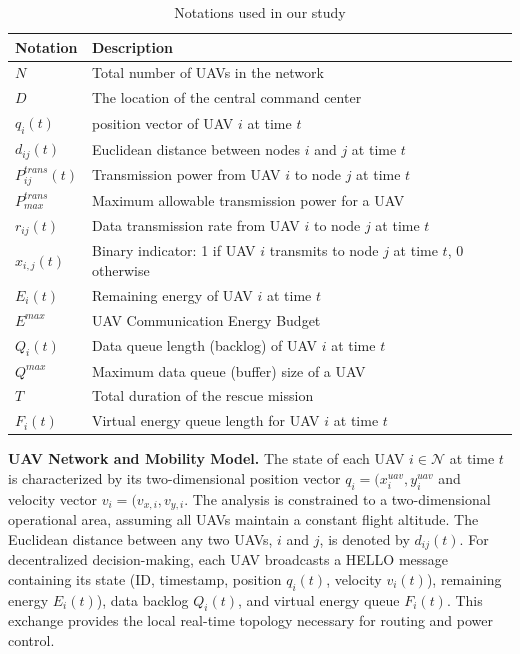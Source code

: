 \documentclass[runningheads]{llncs}
\begin{document}
\begin{table}[h]
\centering
\caption{Notations used in our study}
\begin{tabular}{|l|l|}
\hline
\textbf{Notation} & \textbf{Description} \\
\hline
$N$ & Total number of UAVs in the network \\
\hline
$D$ & The location of the central command center \\
\hline
$q_i(t)$ & position vector of UAV $i$ at time $t$ \\
\hline
$d_{ij}(t)$ & Euclidean distance between nodes $i$ and $j$ at time $t$ \\
\hline
$P_{ij}^{trans}(t)$ & Transmission power from UAV $i$ to node $j$ at time $t$ \\
\hline
$P_{max}^{trans}$ & Maximum allowable transmission power for a UAV \\
\hline
$r_{ij}(t)$ & Data transmission rate from UAV $i$ to node $j$ at time $t$ \\
\hline
$x_{i,j}(t)$ & Binary indicator: 1 if UAV $i$ transmits to node $j$ at time $t$, 0 otherwise \\
\hline
$E_{i}(t)$ & Remaining energy of UAV $i$ at time $t$ \\
\hline
$E^{max}$ & UAV Communication Energy Budget \\
\hline
$Q_{i}(t)$ & Data queue length (backlog) of UAV $i$ at time $t$ \\
\hline
$Q^{max}$ & Maximum data queue (buffer) size of a UAV \\
\hline
$T$ & Total duration of the rescue mission \\
\hline
$F_{i}(t)$ & Virtual energy queue length for UAV $i$ at time $t$ \\
\hline
\end{tabular}
\label{tab:variable}
\end{table}

\textbf{UAV Network and Mobility Model.} The state of each UAV $i\in \mathcal{N}$ at time $t$ is characterized by its two-dimensional position vector $q_{i}=(x_{i}^{uav},y_{i}^{uav}$ and velocity vector $v_i=(v_{x,i},v_{y,i}$. The analysis is constrained to a two-dimensional operational area, assuming all UAVs maintain a constant flight altitude. The Euclidean distance between any two UAVs, $i$ and $j$, is denoted by $d_{ij}(t)$. For decentralized decision-making, each UAV broadcasts a HELLO message containing its state (ID, timestamp, position $q_i(t)$, velocity $ v_i(t)$), remaining energy $E_i(t)$), data backlog $Q_i(t)$, and virtual energy queue $F_i(t)$. This exchange provides the local real-time topology necessary for routing and power control\cite{DRLFR}.
\end{document}

